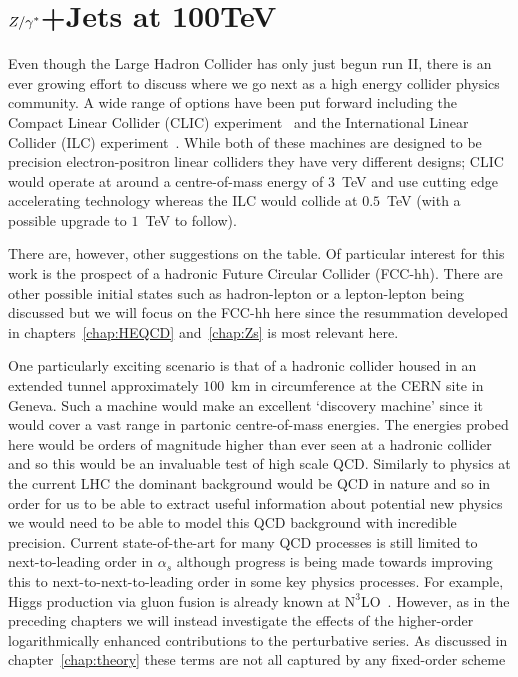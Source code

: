
\chapter{$Z/\gamma^*$+Jets at 100TeV}
\label{chap:100TeV}

	Even though the Large Hadron Collider has only just begun run II, there is an ever growing effort to discuss
	where we go next as a high energy collider physics community.  A wide range of options have been put forward
	including the Compact Linear Collider (CLIC) experiment~\cite{Abramowicz:2013tzc} and the International
	Linear Collider (ILC) experiment~\cite{BrauJames:2007aa}.  While both of these machines are designed to be precision
	electron-positron linear colliders they have very different designs; CLIC would operate at around a
	centre-of-mass energy of $3$~TeV and use cutting edge accelerating technology whereas the ILC would collide
	at $0.5$~TeV (with a possible upgrade to $1$~TeV to follow).

	There are, however, other suggestions on the table.  Of particular interest for this work is the prospect
	of a hadronic Future Circular Collider (FCC-hh).  There are other possible initial states such as
	hadron-lepton or a lepton-lepton being discussed but we will focus on the FCC-hh here since the resummation
	developed in chapters~\ref{chap:HEQCD} and~\ref{chap:Zs} is most relevant here.

	One particularly exciting scenario is that of a \htev hadronic collider housed in an extended tunnel
	approximately $100$~km in circumference at the CERN site in Geneva.  Such a machine would make an
	excellent `discovery machine' since it would cover a vast range in partonic centre-of-mass energies.
	The energies probed here would be orders of magnitude higher than ever seen at a hadronic collider
	and so this would be an invaluable test of high scale QCD.  Similarly to physics at the current LHC
	the dominant background would be QCD in nature and so in order for us to be able to extract useful
	information about potential new physics we would need to be able to model this QCD background with
	incredible precision.  Current state-of-the-art for many QCD processes is still limited to next-to-leading
	order in $\alpha_s$ although progress is being made towards improving this to next-to-next-to-leading
	order in some key physics processes.  For example, Higgs production via gluon fusion is already known at
	$\text{N}^3$LO~\cite{Anastasiou:2015ema}. However, as in the preceding chapters we will instead
	investigate the effects of the higher-order logarithmically enhanced contributions to the perturbative
	series.  As discussed in chapter~\ref{chap:theory} these terms are not all captured by any fixed-order scheme

